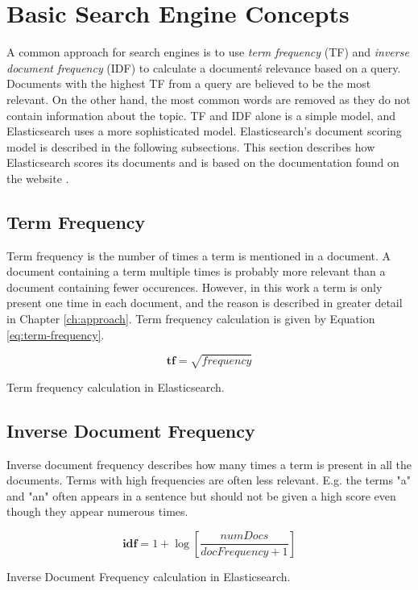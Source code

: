 \section{Basic Search Engine Concepts}
A common approach for search engines is to use \textit{term frequency} (TF) and \textit{inverse document frequency} (IDF) to calculate a document\'s relevance based on a query.
Documents with the highest TF from a query are believed to be the most relevant.
On the other hand, the most common words are removed as they do not contain information about the topic.
TF and IDF alone is a simple model, and Elasticsearch uses a more sophisticated model.
Elasticsearch's document scoring model is described in the following subsections.
This section describes how Elasticsearch scores its documents and is based on the documentation found on the website \cite{elasticsearch-scoring}.

\subsection{Term Frequency}
Term frequency is the number of times a term is mentioned in a document.
A document containing a term multiple times is probably more relevant than a document containing fewer occurences.
However, in this work a term is only present one time in each document, and the reason is described in greater detail in Chapter \ref{ch:approach}.
Term frequency calculation is given by Equation \ref{eq:term-frequency}.

\begin{cequation}[H]
	\begin{equation}
		\mathbf{tf} = \sqrt{frequency}
	\end{equation}
	\caption{Term frequency calculation in Elasticsearch.}
  \label{eq:term-frequency}
\end{cequation}

\subsection{Inverse Document Frequency}
Inverse document frequency describes how many times a term is present in all the documents.
Terms with high frequencies are often less relevant.
E.g. the terms "a" and "an" often appears in a sentence but should not be given a high score even though they appear numerous times.
\begin{cequation}[H]
	\begin{equation}
		\mathbf{idf} = 1 + \log{[\frac{numDocs}{docFrequency + 1}]}
	\end{equation}
	\caption{Inverse Document Frequency calculation in Elasticsearch.}
  \label{eq:idf}
\end{cequation}

